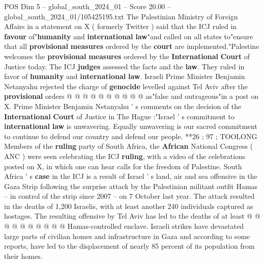 \begin{textsample}{POS Dim 5 – global\_south\_2024\_01 – Score 20.00 – global\_south\_2024\_01/105425195.txt}
The Palestinian Ministry of Foreign Affairs in a statement on X ( formerly Twitter ) said that the ICJ ruled in \textbf{favour} of"\textbf{humanity} and \textbf{international} \textbf{law}"and called on all states to"ensure that all \textbf{provisional} \textbf{measures} ordered by the \textbf{court} are implemented."Palestine welcomes the \textbf{provisional} \textbf{measures} ordered by the \textbf{International} \textbf{Court} of Justice today.
The ICJ \textbf{judges} assessed the facts and the \textbf{law}.
They ruled in favor of \textbf{humanity} and \textbf{international} \textbf{law}.
Israeli Prime Minister Benjamin Netanyahu rejected the charge of \textbf{genocide} levelled against Tel Aviv after the \textbf{provisional} orders @ @ @ @ @ @ @ @ @ @ as"false and outrageous"in a post on X.
Prime Minister Benjamin Netanyahu ' s comments on the decision of the \textbf{International} \textbf{Court} of Justice in The Hague :"Israel ' s commitment to \textbf{international} \textbf{law} is unwavering.
Equally unwavering is our sacred commitment to continue to defend our country and defend our people. **26 ; 97 ; TOOLONG Members of the \textbf{ruling} party of South Africa, the \textbf{African} National Congress ( ANC ) were seen celebrating the ICJ \textbf{ruling}, with a video of the celebrations posted on X, in which one can hear calls for the freedom of Palestine.
South Africa ' s \textbf{case} in the ICJ is a result of Israel ' s land, air and sea offensive in the Gaza Strip following the surprise attack by the Palestinian militant outfit Hamas -- in control of the strip since 2007 -- on 7 October last year.
The attack resulted in the deaths of 1,200 Israelis, with at least another 240 individuals captured as hostages.
The resulting offensive by Tel Aviv has led to the deaths of at least @ @ @ @ @ @ @ @ @ @ Hamas-controlled enclave.
Israeli strikes have devastated large parts of civilian homes and infrastructure in Gaza and according to some reports, have led to the displacement of nearly 85 percent of its population from their homes.

\end{textsample}
